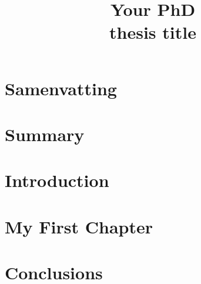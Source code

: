 \documentclass{TUD_NA_PhD_thesis}
\title{Your PhD\\thesis title}
\begin{document}
\frontmatter

\maketitle

\tableofcontents

\chapter{Samenvatting}
\lipsum

\chapter{Summary}
\lipsum

\mainmatter

\chapter{Introduction}
\lipsum

\chapter{My First Chapter}
\lipsum[3]
\cite{Ouden2013}

\backmatter
\setcounter{chapter}{0}

\chapter{Conclusions}
\lipsum[1-10]

\printbibliography
\end{document}
